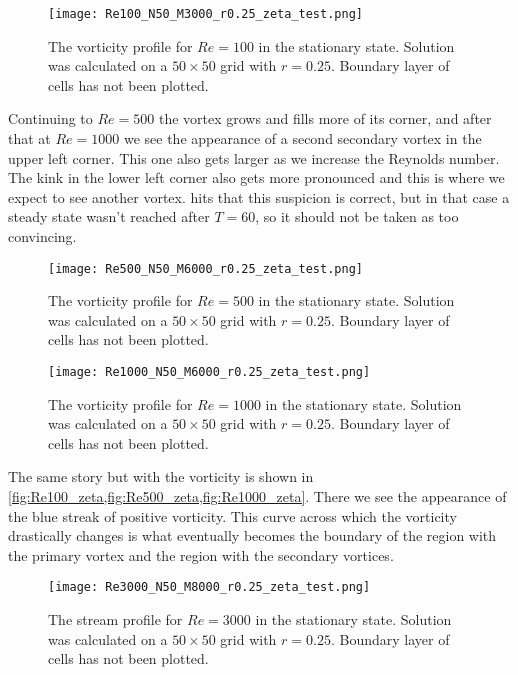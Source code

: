 \documentclass[10pt,a4paper,twocolumn]{article}
\begin{document}
\begin{figure}[!b]
    \centering
    \texttt{[image: Re100\_N50\_M3000\_r0.25\_zeta\_test.png]}
    \caption{The vorticity profile for $Re=100$ in the stationary state. Solution was calculated on a $50 \times 50$ grid with $r=0.25$. Boundary layer of cells has not been plotted.}
    \label{fig:Re100_zeta}
\end{figure}


Continuing to $Re=500$ the vortex grows and fills more of its corner, and after that at $Re=1000$ we see the appearance of a second secondary vortex in the upper left corner. This one also gets larger as we increase the Reynolds number. The kink in the lower left corner also gets more pronounced and this is where we expect to see another vortex.  hits that this suspicion is correct, but in that case a steady state wasn't reached after $T=60$, so it should not be taken as too convincing.


\begin{figure}[!b]
    \centering
    \texttt{[image: Re500\_N50\_M6000\_r0.25\_zeta\_test.png]}
    \caption{The vorticity profile for $Re=500$ in the stationary state. Solution was calculated on a $50 \times 50$ grid with $r=0.25$. Boundary layer of cells has not been plotted.}
    \label{fig:Re500_zeta}
\end{figure}


\begin{figure}[!b]
    \centering
    \texttt{[image: Re1000\_N50\_M6000\_r0.25\_zeta\_test.png]}
    \caption{The vorticity profile for $Re=1000$ in the stationary state. Solution was calculated on a $50 \times 50$ grid with $r=0.25$. Boundary layer of cells has not been plotted.}
    \label{fig:Re1000_zeta}
\end{figure}

The same story but with the vorticity is shown in \cref{fig:Re100_zeta,fig:Re500_zeta,fig:Re1000_zeta}. There we see the appearance of the blue streak of positive vorticity. This curve across which the vorticity drastically changes is what eventually becomes the boundary of the region with the primary vortex and the region with the secondary vortices.

\begin{figure}[!t]
    \centering
    \texttt{[image: Re3000\_N50\_M8000\_r0.25\_zeta\_test.png]}
    \caption{The stream profile for $Re=3000$ in the stationary state. Solution was calculated on a $50 \times 50$ grid with $r=0.25$. Boundary layer of cells has not been plotted.}
    \label{fig:Re3000_zeta}
\end{figure}
\end{document}
